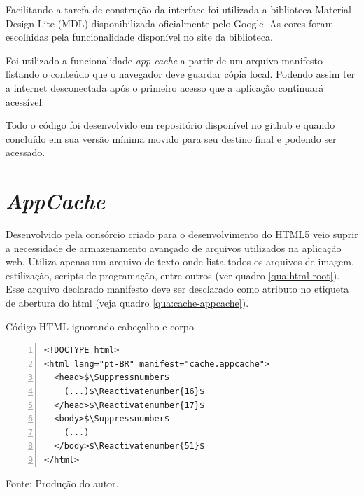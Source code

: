 Facilitando a tarefa de construção da interface foi utilizada a biblioteca Material Design Lite (MDL)\nocite{mdl} disponibilizada oficialmente pelo Google. As cores foram escolhidas pela funcionalidade disponível no site da biblioteca.

Foi utilizado a funcionalidade \textit{app cache} a partir de um arquivo manifesto listando o conteúdo que o navegador deve guardar cópia local. Podendo assim ter a internet desconectada após o primeiro acesso que a aplicação continuará acessível.

Todo o código foi desenvolvido em repositório disponível no github e quando concluído em sua versão mínima movido para seu destino final e podendo ser acessado.\nocite{bizual}\color{black}

\section{\textit{AppCache}}

Desenvolvido pela consórcio criado para o desenvolvimento do HTML5 veio suprir a necessidade de armazenamento avançado de arquivos utilizados na aplicação web. Utiliza apenas um arquivo de texto onde lista todos os arquivos de imagem, estilização, scripts de programação, entre outros (ver quadro \ref{qua:html-root}). Esse arquivo declarado manifesto deve ser desclarado como atributo no etiqueta de abertura do html (veja quadro  \ref{qua:cache-appcache}).

\let\origthelstnumber\thelstnumber
\makeatletter
\newcommand*\Suppressnumber{%
  \lst@AddToHook{OnNewLine}{%
    \let\thelstnumber\relax%
     \advance\c@lstnumber-\@ne\relax%
    }%
}

\newcommand*\Reactivatenumber[1]{%
  \lst@AddToHook{OnNewLine}{%
   \let\thelstnumber\origthelstnumber%
   \setcounter{lstnumber}{\numexpr#1-1\relax}%
  }%
}

\makeatother

\begin{quadro}[h]
\centering
  \caption{Código HTML ignorando cabeçalho e corpo}\label{qua:html-root}
\begin{lstlisting}[numbers=left,escapeinside=\$\$,frame=single]
<!DOCTYPE html>
<html lang="pt-BR" manifest="cache.appcache">
  <head>$\Suppressnumber$
    (...)$\Reactivatenumber{16}$
  </head>$\Reactivatenumber{17}$
  <body>$\Suppressnumber$
    (...)
  </body>$\Reactivatenumber{51}$
</html>

\end{lstlisting}
  \caption*{\ifdraft{\color{green}}{}\footnotesize Fonte: Produção do autor.}
\end{quadro}

